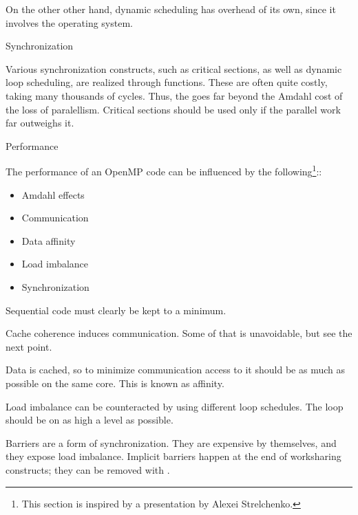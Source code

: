 On the other other hand, dynamic scheduling has overhead of its own,
since it involves the operating system.

 {Synchronization}

Various synchronization constructs, such as critical sections, as well as
dynamic loop scheduling, are realized through 
functions. These are often quite costly, taking many thousands of cycles.
Thus, the  goes far beyond
the Amdahl cost of the loss of paralellism. Critical sections should be used only
if the parallel work far outweighs it.

 {Performance}


The performance of an OpenMP code can be influenced by the following\footnote
{This section is inspired by a presentation by Alexei Strelchenko.}::
\begin{itemize}
\item Amdahl effects
\item Communication
\item Data affinity
\item Load imbalance
\item Synchronization
\end{itemize}

Sequential code must clearly be kept to a minimum.

Cache coherence induces communication. Some of that is unavoidable,
but see the next point.

Data is cached, so to minimize communication
access to it should be as much as possible
on the same core. This is known as affinity.

Load imbalance can be counteracted by using
different loop schedules. The loop should be
on as high a level as possible.

Barriers are a form of synchronization.
They are expensive by themselves, and they
expose load imbalance. Implicit barriers happen
at the end of worksharing constructs; they
can be removed with .




\endinput

\Level 0 {Idioms}

\Level 1 {While loops}

\verbatimsnippet{linkedlist}

